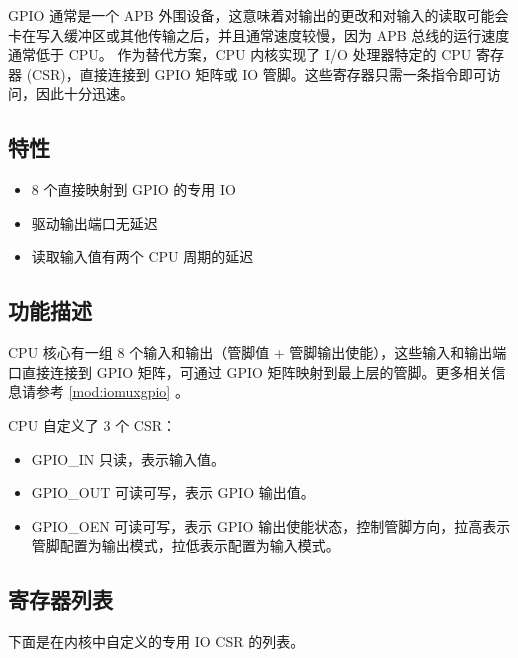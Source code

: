 \documentclass[main\_\_CN.tex]{subfiles}
\begin{document}
GPIO 通常是一个 APB 外围设备，这意味着对输出的更改和对输入的读取可能会卡在写入缓冲区或其他传输之后，并且通常速度较慢，因为 APB 总线的运行速度通常低于 CPU。
作为替代方案，CPU 内核实现了 I/O 处理器特定的 CPU 寄存器 (CSR)，直接连接到 GPIO 矩阵或 IO 管脚。这些寄存器只需一条指令即可访问，因此十分迅速。

\subsection{特性}
\label{sec:riscvcpu-fastio-features}
 \begin{itemize}
    \item 8 个直接映射到 GPIO 的专用 IO
    \item 驱动输出端口无延迟
    \item 读取输入值有两个 CPU 周期的延迟
\end{itemize}

\subsection{功能描述}
\label{sec:riscvcpu-fastio-func-descr}

CPU 核心有一组 8 个输入和输出（管脚值 + 管脚输出使能），这些输入和输出端口直接连接到 GPIO 矩阵，可通过 GPIO 矩阵映射到最上层的管脚。更多相关信息请参考 \ref{mod:iomuxgpio} \textit{}。

CPU 自定义了 3 个 CSR：
\begin{itemize}
    \item GPIO\_IN 只读，表示输入值。
    \item GPIO\_OUT 可读可写，表示 GPIO 输出值。
    \item GPIO\_OEN 可读可写，表示 GPIO 输出使能状态，控制管脚方向，拉高表示管脚配置为输出模式，拉低表示配置为输入模式。
\end{itemize}


\clearpage
\hypertarget{riscvcpu-fastio-reg-summ}{}
\subsection{寄存器列表}
\label{sec:riscvcpu-fastio-reg-summ}

下面是在内核中自定义的专用 IO CSR 的列表。



\end{document}
